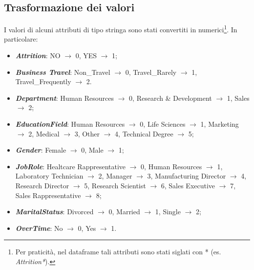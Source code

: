 \subsection{Trasformazione dei valori}
I valori di alcuni attributi di tipo stringa sono stati convertiti in numerici\footnote{Per praticità, nel dataframe tali attributi sono stati siglati con * (es. \textit{Attrition*}).}. In particolare:
\begin{itemize}
\itemsep0em 
    \item \textit{\textbf{Attrition}}: NO $\rightarrow$ 0,  YES $\rightarrow$ 1;
    \item \textit{\textbf{Business Travel}}: Non\_Travel $\rightarrow$ 0,  Travel\_Rarely $\rightarrow$ 1,  Travel\_Frequently $\rightarrow$ 2.
    \item \textit{\textbf{Department}}: Human Resources $\rightarrow$ 0,  Research \& Development  $\rightarrow$ 1, Sales $\rightarrow$ 2;
    \item \textit{\textbf{EducationField}}: Human Resources $\rightarrow$ 0, Life Sciences $\rightarrow$ 1, Marketing $\rightarrow$ 2, Medical $\rightarrow$ 3, Other $\rightarrow$ 4, Technical Degree $\rightarrow$ 5;
    \item \textbf{\textit{Gender}}: Female $\rightarrow$ 0, Male $\rightarrow$ 1; 
    \item \textit{\textbf{JobRole}}: Healtcare Rappresentative $\rightarrow$ 0, Human Resources $\rightarrow$ 1, Laboratory Technician $\rightarrow$ 2, Manager $\rightarrow$ 3, Manufacturing Director $\rightarrow$ 4, Research Director $\rightarrow$ 5, Research Scientist $\rightarrow$ 6, Sales Executive $\rightarrow$ 7, Sales Rappresentative $\rightarrow$ 8;
    \item \textit{\textbf{MaritalStatus}}: Divorced $\rightarrow$ 0, Married $\rightarrow$ 1, Single $\rightarrow$ 2;
    \item \textbf{\textit{OverTime}}: No $\rightarrow$ 0, Yes $\rightarrow$ 1.
\end{itemize}

